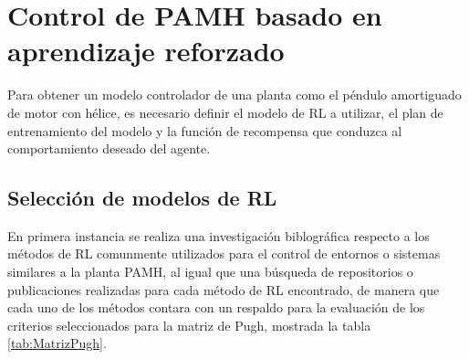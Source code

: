 \chapter{Control de PAMH basado en aprendizaje reforzado}
\label{ch:ControlPAMH}

Para obtener un modelo controlador de una planta como el péndulo amortiguado de motor con hélice, es necesario definir el modelo de RL a utilizar, el plan de entrenamiento del modelo y la función de recompensa que conduzca al comportamiento deseado del agente.

\section{Selección de modelos de RL}

En primera instancia se realiza una investigación biblográfica respecto a los métodos de RL comunmente utilizados para el control de entornos o sistemas similares a la planta PAMH, al igual que una búsqueda de repositorios o publicaciones realizadas para cada método de RL encontrado, de manera que cada uno de los métodos contara con un respaldo para la evaluación de los criterios seleccionados para la matriz de Pugh, mostrada la tabla \ref{tab:MatrizPugh}.

